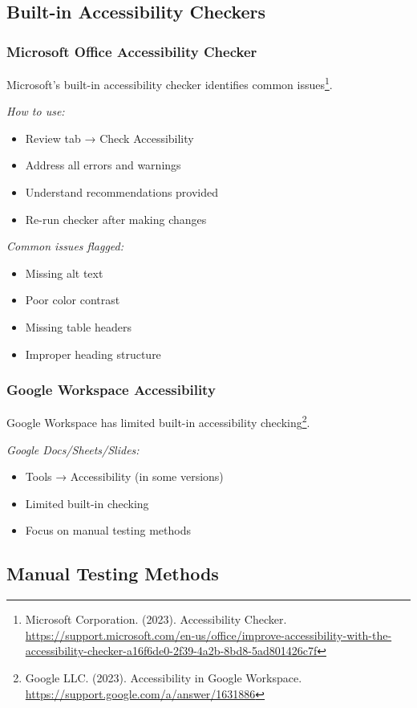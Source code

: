 \subsection{Built-in Accessibility Checkers}

\subsubsection{Microsoft Office Accessibility Checker}
Microsoft's built-in accessibility checker identifies common issues\footnote{Microsoft Corporation. (2023). Accessibility Checker. \url{https://support.microsoft.com/en-us/office/improve-accessibility-with-the-accessibility-checker-a16f6de0-2f39-4a2b-8bd8-5ad801426c7f}}.

\emph{How to use:}
\begin{itemize}
\item Review tab → Check Accessibility
\item Address all errors and warnings
\item Understand recommendations provided
\item Re-run checker after making changes
\end{itemize}

\emph{Common issues flagged:}
\begin{itemize}
\item Missing alt text
\item Poor color contrast
\item Missing table headers
\item Improper heading structure
\end{itemize}

\subsubsection{Google Workspace Accessibility}
Google Workspace has limited built-in accessibility checking\footnote{Google LLC. (2023). Accessibility in Google Workspace. \url{https://support.google.com/a/answer/1631886}}.

\emph{Google Docs/Sheets/Slides:}
\begin{itemize}
\item Tools → Accessibility (in some versions)
\item Limited built-in checking
\item Focus on manual testing methods
\end{itemize}

\subsection{Manual Testing Methods}

